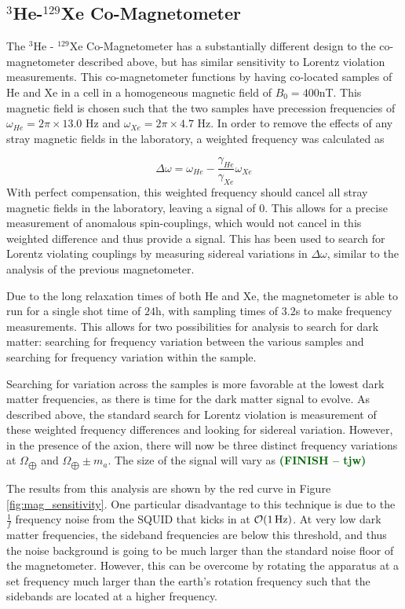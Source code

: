 \documentclass[aps,prd,final,letterpaper]{revtex4}
\newcommand{\tjw}[1]{\textbf{\textcolor{darkgreen}{(#1 -- tjw)}}}
\begin{document}
\subsection{$^{3}$He-$^{129}$Xe Co-Magnetometer}

The $^{3}$He - $^{129}$Xe Co-Magnetometer has a substantially different design to the co-magnetometer described above, but has similar sensitivity to Lorentz violation measurements. This co-magnetometer functions by having co-located samples of He and Xe in a cell in a homogeneous magnetic field of $B_0 = 400$nT. This magnetic field is chosen such that the two samples have precession frequencies of $\omega_{He} = 2\pi \times 13.0$ Hz and $\omega_{Xe} = 2\pi \times 4.7$ Hz. In order to remove the effects of any stray magnetic fields in the laboratory, a weighted frequency was calculated as

\begin{equation}
\Delta \omega = \omega_{He} - \frac{\gamma_{He}}{\gamma_{Xe}}\omega_{Xe}
\end{equation}
With perfect compensation, this weighted frequency should cancel all stray magnetic fields in the laboratory, leaving a signal of $0$. This allows for a precise measurement of anomalous spin-couplings, which would not cancel in this weighted difference and thus provide a signal. This has been used to search for Lorentz violating couplings by measuring sidereal variations in $\Delta \omega$, similar to the analysis of the previous magnetometer.  

Due to the long relaxation times of both He and Xe, the magnetometer is able to run for a single shot time of $24$h, with sampling times of $3.2$s to make frequency measurements. This allows for two possibilities for analysis to search for dark matter: searching for frequency variation between the various samples and searching for frequency variation within the sample.

Searching for variation across the samples is more favorable at the lowest dark matter frequencies, as there is time for the dark matter signal to evolve. As described above, the standard search for Lorentz violation is measurement of these weighted frequency differences and looking for sidereal variation. However, in the presence of the axion, there will now be three distinct frequency variations at $\Omega_{\bigoplus}$ and $\Omega_{\bigoplus} \pm m_a$. The size of the signal will vary as \tjw{FINISH}

The results from this analysis are shown by the red curve in Figure \ref{fig:mag_sensitivity}. One particular disadvantage to this technique is due to the $\frac{1}{f}$ frequency noise from the SQUID that kicks in at $\mathcal{O}(1 \, \rm{Hz})$. At very low dark matter frequencies, the sideband frequencies are below this threshold, and thus the noise background is going to be much larger than the standard noise floor of the magnetometer. However, this can be overcome by rotating the apparatus at a set frequency much larger than the earth's rotation frequency such that the sidebands are located at a higher frequency.
\end{document}
